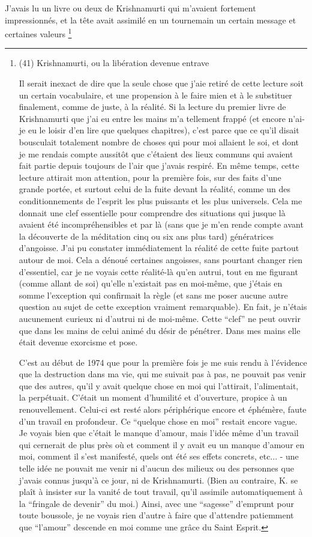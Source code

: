 J'avais lu un livre ou deux de Krishnamurti qui m'avaient fortement impressionnés, et la tête avait assimilé en un tournemain un certain message et certaines valeurs \footnote{(41) Krishnamurti, ou la libération devenue entrave

Il serait inexact de dire que la seule chose que j'aie retiré de cette lecture soit un certain vocabulaire, et une propension à le faire mien et à le substituer finalement, comme de juste, à la réalité. Si la lecture du premier livre de Krishnamurti que j'ai eu entre les mains m'a tellement frappé (et encore n'ai-je eu le loisir d'en lire que quelques chapitres), c'est parce que ce qu'il disait bousculait totalement nombre de choses qui pour moi allaient le soi, et dont je me rendais compte aussitôt que c'étaient des lieux communs qui avaient fait partie depuis toujours de l'air que j'avais respiré. En même temps, cette lecture attirait mon attention, pour la première fois, sur des faits d'une grande portée, et surtout celui de la fuite devant la réalité, comme un des conditionnements de l'esprit les plus puissants et les plus universels. Cela me donnait une clef essentielle pour comprendre des situations qui jusque là avaient été incompréhensibles et par là (sans que je m'en rende compte avant la découverte de la méditation cinq ou six ans plus tard) génératrices d'angoisse. J'ai pu constater immédiatement la réalité de cette fuite partout autour de moi. Cela a dénoué certaines angoisses, sans pourtant changer rien d'essentiel, car je ne voyais cette réalité-là qu'en autrui, tout en me figurant (comme allant de soi) qu'elle n'existait pas en moi-même, que j'étais en somme l'exception qui confirmait la règle (et sans me poser aucune autre question au sujet de cette exception vraiment remarquable). En fait, je n'étais aucunement curieux ni d'autrui ni de moi-même. Cette ``clef'' ne peut ouvrir que dans les mains de celui animé du désir de pénétrer. Dans mes mains elle était devenue exorcisme et pose.

C'est au début de 1974 que pour la première fois je me suis rendu à l'évidence que la destruction dans ma vie, qui me suivait pas à pas, ne pouvait pas venir que des autres, qu'il y avait quelque chose en moi qui l'attirait, l'alimentait, la perpétuait. C'était un moment d'humilité et d'ouverture, propice à un renouvellement. Celui-ci est resté alors périphérique encore et éphémère, faute d'un travail en profondeur. Ce ``quelque chose en moi'' restait encore vague. Je voyais bien que c'était le manque d'amour, mais l'idée même d'un travail qui cernerait de plus près où et comment il y avait eu un manque d'amour en moi, comment il s'est manifesté, quels ont été ses effets concrets, etc... - une telle idée ne pouvait me venir ni d'aucun des milieux ou des personnes que j'avais connus jusqu'à ce jour, ni de Krishnamurti. (Bien au contraire, K. se plaît à insister sur la vanité de tout travail, qu'il assimile automatiquement à la ``fringale de devenir'' du moi.) Ainsi, avec une ``sagesse'' d'emprunt pour toute boussole, je ne voyais rien d'autre à faire que d'attendre patiemment que ``l'amour'' descende en moi comme une grâce du Saint Esprit.

}
